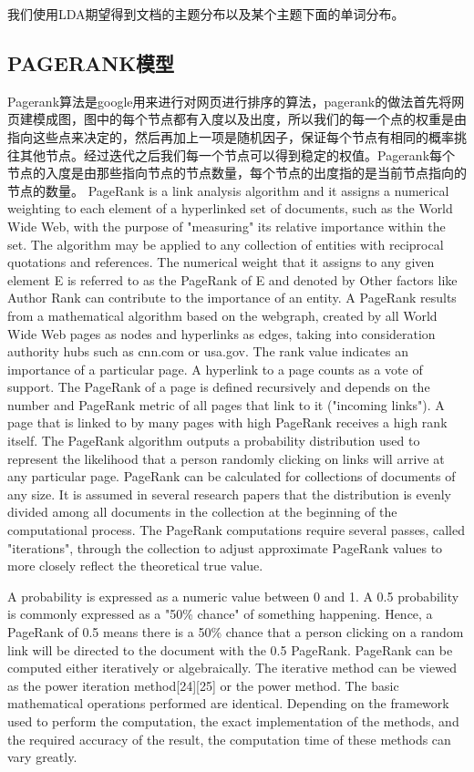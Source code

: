 \documentclass[master]{njuthesis}
\begin{document}
我们使用LDA期望得到文档的主题分布以及某个主题下面的单词分布。

\subsection{PAGERANK模型}

Pagerank算法是google用来进行对网页进行排序的算法，pagerank的做法首先将网页建模成图，图中的每个节点都有入度以及出度，所以我们的每一个点的权重是由指向这些点来决定的，然后再加上一项是随机因子，保证每个节点有相同的概率挑往其他节点。经过迭代之后我们每一个节点可以得到稳定的权值。Pagerank每个节点的入度是由那些指向节点的节点数量，每个节点的出度指的是当前节点指向的节点的数量。
PageRank is a link analysis algorithm and it assigns a numerical weighting to each element of a hyperlinked set of documents, such as the World Wide Web, with the purpose of "measuring" its relative importance within the set. The algorithm may be applied to any collection of entities with reciprocal quotations and references. The numerical weight that it assigns to any given element E is referred to as the PageRank of E and denoted by  Other factors like Author Rank can contribute to the importance of an entity.
A PageRank results from a mathematical algorithm based on the webgraph, created by all World Wide Web pages as nodes and hyperlinks as edges, taking into consideration authority hubs such as cnn.com or usa.gov. The rank value indicates an importance of a particular page. A hyperlink to a page counts as a vote of support. The PageRank of a page is defined recursively and depends on the number and PageRank metric of all pages that link to it ("incoming links"). A page that is linked to by many pages with high PageRank receives a high rank itself.
The PageRank algorithm outputs a probability distribution used to represent the likelihood that a person randomly clicking on links will arrive at any particular page. PageRank can be calculated for collections of documents of any size. It is assumed in several research papers that the distribution is evenly divided among all documents in the collection at the beginning of the computational process. The PageRank computations require several passes, called "iterations", through the collection to adjust approximate PageRank values to more closely reflect the theoretical true value.

A probability is expressed as a numeric value between 0 and 1. A 0.5 probability is
commonly expressed as a "50\% chance" of something happening. Hence, a PageRank of 0.5 means there is a 50\% chance that a person clicking on a random link will be directed to the document with the 0.5 PageRank.
PageRank can be computed either iteratively or algebraically. The iterative method can be viewed as the power iteration method[24][25] or the power method. The basic mathematical operations performed are identical.
Depending on the framework used to perform the computation, the exact implementation of the methods, and the required accuracy of the result, the computation time of these methods can vary greatly.
\end{document}
